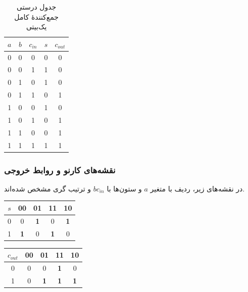 \documentclass[11pt,a4paper]{article}
\begin{document}
\begin{table}[H]
  \centering
  \begin{latin}
  \renewcommand{\arraystretch}{1.2}
  \begin{tabular}{ccc|cc}
    \toprule
    $a$ & $b$ & $c_{in}$ & $s$ & $c_{out}$ \\
    \midrule
    0&0&0&0&0 \\
    0&0&1&1&0 \\
    0&1&0&1&0 \\
    0&1&1&0&1 \\
    1&0&0&1&0 \\
    1&0&1&0&1 \\
    1&1&0&0&1 \\
    1&1&1&1&1 \\
    \bottomrule
  \end{tabular}
  \end{latin}
  \caption{جدول درستی جمع‌کنندهٔ کامل یک‌بیتی}
  \label{tab:fa-truth}
\end{table}

\subsubsection{نقشه‌های کارنو و روابط خروجی}
در نقشه‌های زیر، ردیف با متغیر \(a\) و ستون‌ها با \(bc_{in}\) و ترتیب گری  مشخص شده‌اند.

\begin{table}[H]
  \centering
  \begin{minipage}{0.46\textwidth}
    \centering
    \begin{latin}
    \renewcommand{\arraystretch}{1.35}
    \begin{tabular}{c|cccc}
      $s$ & 00 & 01 & 11 & 10 \\ \hline
      0 & 0 & \textbf{1} & 0 & \textbf{1} \\
      1 & \textbf{1} & 0 & \textbf{1} & 0 \\
    \end{tabular}
    \end{latin}
    \label{tab:kmap-fa-s}
  \end{minipage}
  \hfill
  \begin{minipage}{0.46\textwidth}
    \centering
    \begin{latin}
    \renewcommand{\arraystretch}{1.35}
    \begin{tabular}{c|cccc}
      $c_{out}$ & 00 & 01 & 11 & 10 \\ \hline
      0 & 0 & 0 & \textbf{1} & 0 \\
      1 & 0 & \textbf{1} & \textbf{1} & \textbf{1} \\
    \end{tabular}
    \end{latin}
    \label{tab:kmap-fa-cout}
  \end{minipage}
\end{table}
\end{document}
